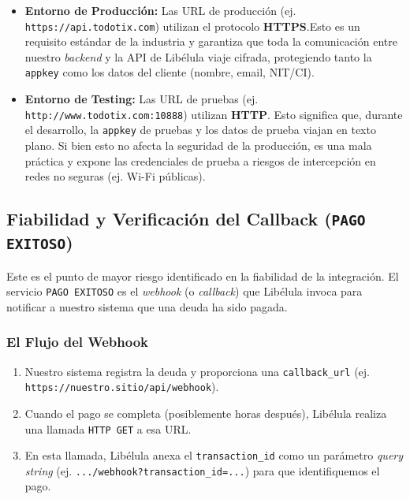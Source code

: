     \begin{itemize}
        \item \textbf{Entorno de Producción:} Las URL de producción (ej. \texttt{https://api.todotix.com}) utilizan el protocolo \textbf{HTTPS}.Esto es un requisito estándar de la industria y garantiza que toda la comunicación entre nuestro \emph{backend} y la API de Libélula viaje cifrada, protegiendo tanto la \texttt{appkey} como los datos del cliente (nombre, email, NIT/CI).
        \item \textbf{Entorno de Testing:} Las URL de pruebas (ej. \texttt{http://www.todotix.com:10888}) utilizan \textbf{HTTP}. Esto significa que, durante el desarrollo, la \texttt{appkey} de pruebas y los datos de prueba viajan en texto plano. Si bien esto no afecta la seguridad de la producción, es una mala práctica y expone las credenciales de prueba a riesgos de intercepción en redes no seguras (ej. Wi-Fi públicas).
    \end{itemize}

    \subsection{Fiabilidad y Verificación del Callback (\texttt{PAGO EXITOSO})}
        Este es el punto de mayor riesgo identificado en la fiabilidad de la integración. El servicio \texttt{PAGO EXITOSO} 
        es el \emph{webhook} (o \emph{callback}) que Libélula invoca para notificar a nuestro sistema que una deuda ha sido 
        pagada.\par

        \subsubsection{El Flujo del Webhook}
            \begin{enumerate}
                \item Nuestro sistema registra la deuda y proporciona una \texttt{callback\_url} (ej. \texttt{https://nuestro.sitio/api/webhook}).
                \item Cuando el pago se completa (posiblemente horas después), Libélula realiza una llamada \texttt{HTTP GET} a esa URL.
                \item En esta llamada, Libélula anexa el \texttt{transaction\_id} como un parámetro \emph{query string} (ej. \texttt{.../webhook?transaction\_id=...}) para que identifiquemos el pago.
            \end{enumerate}

